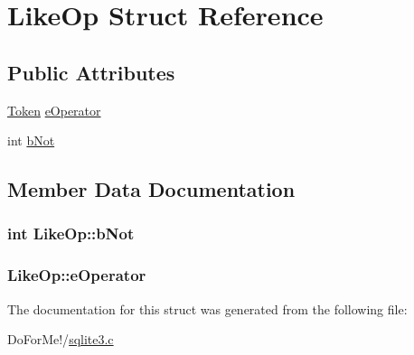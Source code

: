 \hypertarget{struct_like_op}{\section{Like\-Op Struct Reference}
\label{struct_like_op}
}
\subsection*{Public Attributes}
\begin{DoxyCompactItemize}
\item 
\hyperlink{struct_token}{Token} \hyperlink{struct_like_op_a02dccb0eea9610285333434a755acae8}{e\-Operator}
\item 
int \hyperlink{struct_like_op_a09daccf65c917f32e8b60b347e8893cf}{b\-Not}
\end{DoxyCompactItemize}


\subsection{Member Data Documentation}
\hypertarget{struct_like_op_a09daccf65c917f32e8b60b347e8893cf}{
\subsubsection[{b\-Not}]{\setlength{\rightskip}{0pt plus 5cm}int Like\-Op\-::b\-Not}}\label{struct_like_op_a09daccf65c917f32e8b60b347e8893cf}
\hypertarget{struct_like_op_a02dccb0eea9610285333434a755acae8}{
\subsubsection[{e\-Operator}]{ Like\-Op\-::e\-Operator}}\label{struct_like_op_a02dccb0eea9610285333434a755acae8}


The documentation for this struct was generated from the following file\-:\begin{DoxyCompactItemize}
\item 
Do\-For\-Me!/\hyperlink{sqlite3_8c}{sqlite3.\-c}\end{DoxyCompactItemize}
